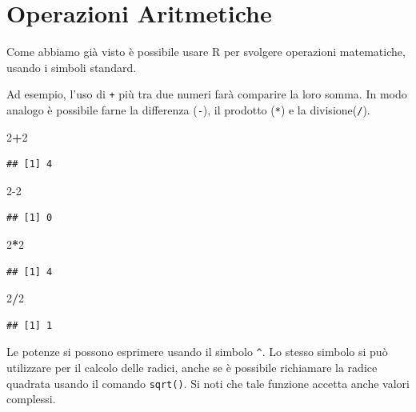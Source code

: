 \documentclass[]{book}
\newenvironment{Shaded}{\begin{snugshade}}{\end{snugshade}}
\newcommand{\DecValTok}[1]{\textcolor[rgb]{0.00,0.00,0.81}{#1}}
\newcommand{\OperatorTok}[1]{\textcolor[rgb]{0.81,0.36,0.00}{\textbf{#1}}}
\begin{document}
\hypertarget{operazioni-aritmetiche}{%
\section{Operazioni Aritmetiche}\label{operazioni-aritmetiche}}

Come abbiamo già visto è possibile usare R per svolgere operazioni matematiche, usando i simboli standard.

Ad esempio, l'uso di \texttt{+} più tra due numeri farà comparire la loro somma.
In modo analogo è possibile farne la differenza (\texttt{-}), il prodotto (\texttt{*}) e la divisione(\texttt{/}).

\begin{Shaded}
\begin{Highlighting}[]
\DecValTok{2}\OperatorTok{+}\DecValTok{2} 
\end{Highlighting}
\end{Shaded}

\begin{verbatim}
## [1] 4
\end{verbatim}

\begin{Shaded}
\begin{Highlighting}[]
\DecValTok{2-2}
\end{Highlighting}
\end{Shaded}

\begin{verbatim}
## [1] 0
\end{verbatim}

\begin{Shaded}
\begin{Highlighting}[]
\DecValTok{2}\OperatorTok{*}\DecValTok{2}
\end{Highlighting}
\end{Shaded}

\begin{verbatim}
## [1] 4
\end{verbatim}

\begin{Shaded}
\begin{Highlighting}[]
\DecValTok{2}\OperatorTok{/}\DecValTok{2}
\end{Highlighting}
\end{Shaded}

\begin{verbatim}
## [1] 1
\end{verbatim}

Le potenze si possono esprimere usando il simbolo \texttt{\^{}}. Lo stesso simbolo si può utilizzare per il calcolo delle radici, anche se è possibile richiamare la radice quadrata usando il comando \texttt{sqrt()}. Si noti che tale funzione accetta anche valori complessi.
\end{document}
